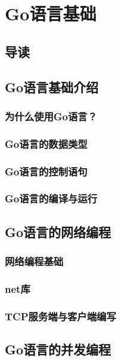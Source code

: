 \chapter{Go语言基础}

\section{导读}

\section{Go语言基础介绍}

\subsection{为什么使用Go语言？}

\subsection{Go语言的数据类型}

\subsection{Go语言的控制语句}

\subsection{Go语言的编译与运行}

\section{Go语言的网络编程}

\subsection{网络编程基础}

\subsection{net库}

\subsection{TCP服务端与客户端编写}

\section{Go语言的并发编程}

